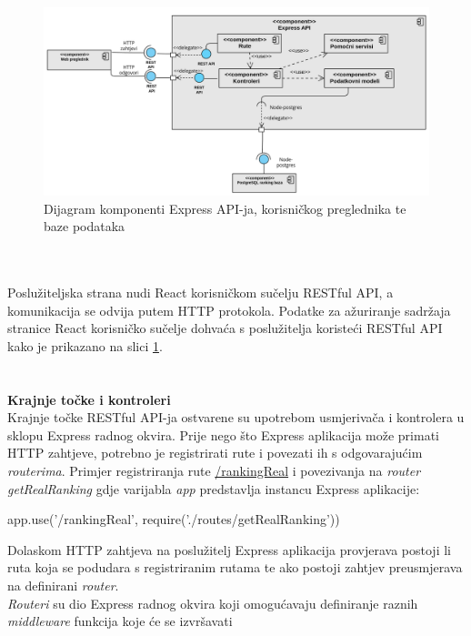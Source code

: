 \documentclass[times, utf8, zavrsni]{fer}
\begin{document}
\begin{figure}[htb]
    \hspace*{-2cm} 
       \includegraphics[scale=0.36]{expressdijagramkomponenti.png} 
       \caption{Dijagram komponenti Express API-ja, korisničkog preglednika te baze podataka}
       \label{fig:expressdijagramkomponenti}
       \end{figure}      
\\\\Poslužiteljska strana nudi React korisničkom sučelju RESTful API, a komunikacija se odvija putem HTTP protokola. Podatke za ažuriranje sadržaja stranice 
React korisničko sučelje dohvaća s poslužitelja koristeći RESTful API kako je prikazano na slici \ref{fig:expressdijagramkomponenti}.
\\\\\\\textbf{Krajnje točke i kontroleri}
\\Krajnje točke  RESTful API-ja ostvarene su upotrebom usmjerivača  i kontrolera u sklopu Express radnog okvira. 
Prije nego što Express aplikacija može primati HTTP zahtjeve, potrebno je registrirati rute i povezati ih s odgovarajućim \emph{routerima}.
Primjer registriranja rute \url{/rankingReal} i povezivanja na \emph{router} \emph{getRealRanking} gdje varijabla \emph{app} predstavlja instancu Express aplikacije:
\begin{verbnobox}[\fontsize{10pt}{10pt}\selectfont] 
app.use('/rankingReal', require('./routes/getRealRanking'))
\end{verbnobox}  
Dolaskom HTTP zahtjeva na poslužitelj Express aplikacija provjerava postoji li ruta koja se podudara s registriranim rutama te ako postoji 
zahtjev preusmjerava na definirani \emph{router}.
\\\emph{Routeri} su dio Express radnog okvira koji omogućavaju definiranje raznih \emph{middleware} funkcija koje će se izvršavati 
\end{document}
